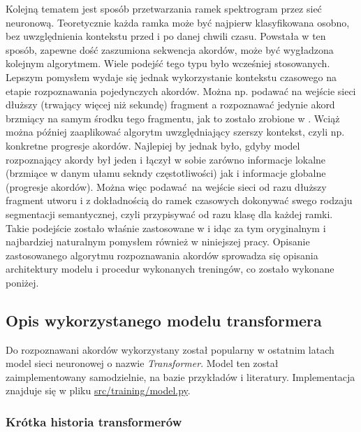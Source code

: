 Kolejną tematem jest sposób przetwarzania ramek spektrogram przez sieć neuronową. Teoretycznie każda
ramka może być najpierw klasyfikowana osobno, bez uwzględnienia kontekstu przed i po danej chwili
czasu. Powstała w ten sposób, zapewne dość zaszumiona sekwencja akordów, może być wygładzona
kolejnym algorytmem. Wiele podejść tego typu było wcześniej stosowanych. Lepszym pomysłem wydaje się
jednak wykorzystanie kontekstu czasowego na etapie rozpoznawania pojedynczych akordów. Można np.
podawać na wejście sieci dłuższy (trwający więcej niż sekundę) fragment a rozpoznawać jedynie akord
brzmiący na samym środku tego fragmentu, jak to zostało zrobione w \cite{korzeniowski_fully_2016}.
Wciąż można później zaaplikować algorytm uwzględniający szerszy kontekst, czyli np. konkretne
progresje akordów. Najlepiej by jednak było, gdyby model rozpoznający akordy był jeden i łączył w
sobie zarówno informacje lokalne (brzmiące w danym ułamu sekndy częstotliwości) jak i informacje
globalne (progresje akordów). Można więc podawać na wejście sieci od razu dłuższy fragment utworu i
z dokładnością do ramek czasowych dokonywać swego rodzaju segmentacji semantycznej, czyli
przypisywać od razu klasę dla każdej ramki. Takie podejście zostało właśnie zastosowane w
\cite{park_bi-directional_2019} i idąc za tym oryginalnym i najbardziej naturalnym pomysłem również
w niniejszej pracy. Opisanie zastosowanego algorytmu rozpoznawania akordów sprowadza się opisania
architektury modelu i procedur wykonanych treningów, co zostało wykonane poniżej.

\subsection{Opis wykorzystanego modelu transformera}

Do rozpoznawani akordów wykorzystany został popularny w ostatnim latach model sieci neuronowej o
nazwie \emph{Transformer}. Model ten został zaimplementowany samodzielnie, na bazie przykładów i
literatury. Implementacja znajduje się w pliku \url{src/training/model.py}.

\subsubsection{Krótka historia transformerów}

